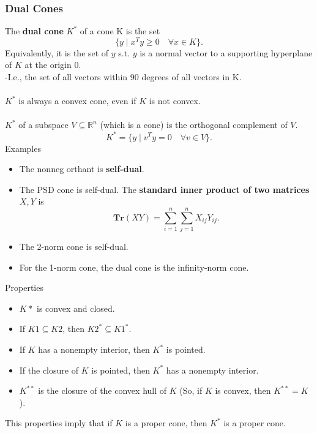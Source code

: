 \documentclass[]{article}
\begin{document}
\subsubsection*{Dual Cones}
The \textbf{dual cone} $K^{*}$ of a cone K is the set $$\{y \mid x^{T}y \geq 0 \quad \forall x \in K\}.$$
Equivalently, it is the set of $y$ s.t. $y$ is a normal vector to a supporting hyperplane of $K$ at the origin 0. \\
-I.e., the set of all vectors within 90 degrees of all vectors in K. \\\\
$K^{*}$ is always a convex cone, even if $K$ is not convex. \\\\
$K^{*}$ of a subspace $V \subseteq \mathbb{R}^{n}$ (which is a cone) is the orthogonal complement of $V$. $$K^{*} = \{y \mid v^{T}y=0 \quad \forall v \in V \}.$$
Examples
\begin{itemize}
	\item The nonneg orthant is \textbf{self-dual}.
	\item The PSD cone is self-dual. The \textbf{standard inner product of two matrices} $X, Y$ is $$\textbf{Tr}(XY) = \sum_{i=1}^{n} \sum_{j=1}^{n} X_{ij}Y_{ij}.$$
	\item The 2-norm cone is self-dual.
	\item For the 1-norm cone, the dual cone is the infinity-norm cone. \\
\end{itemize}
Properties
\begin{itemize}
	\item $K*$ is convex and closed.
	\item If $K1 \subseteq K2$, then $K2^{*} \subseteq K1^{*}.$
	\item If $K$ has a nonempty interior, then $K^{*}$ is pointed.
	\item If the closure of $K$ is pointed, then $K^{*}$ has a nonempty interior.
	\item $K^{**}$ is the closure of the convex hull of $K$ (So, if $K$ is convex, then $K^{**}=K$). 
\end{itemize}
This properties imply that if $K$ is a proper cone, then $K^{*}$ is a proper cone. \\
\end{document}
